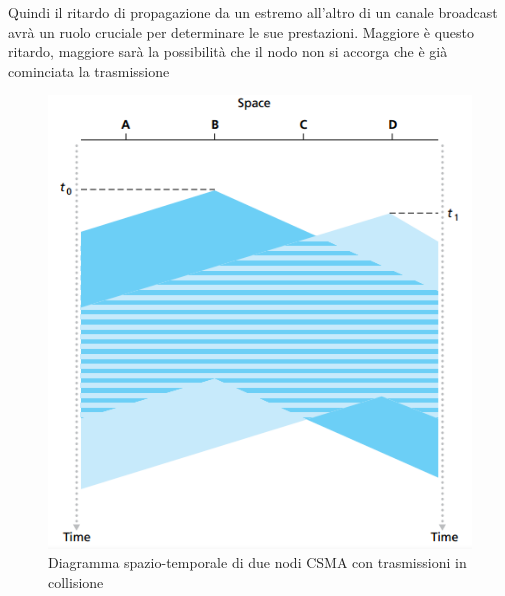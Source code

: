 \documentclass[11pt,a4paper]{article}
\begin{document}
Quindi il ritardo di propagazione da un estremo all'altro di un canale broadcast avrà un ruolo cruciale per determinare le sue prestazioni. Maggiore è questo ritardo, maggiore sarà la possibilità che il nodo non si accorga che è già cominciata la trasmissione
\begin{figure}
	\begin{center}
		\includegraphics[scale=0.6]{img/080.png}
		\caption{Diagramma spazio-temporale di due nodi CSMA con trasmissioni in collisione}
		\label{fig: 080}
	\end{center}
\end{figure}
\end{document}
